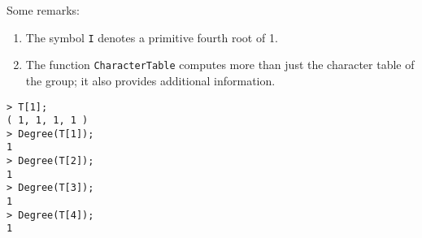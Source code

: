 \begin{example}
%
%
%                   
%                   
%
%
%                
%                
Some remarks: 
 \begin{enumerate}
     \item The symbol \lstinline{I} denotes a primitive fourth root of 1.
     \item 	The function \lstinline{CharacterTable} computes more than just the character table of the group; it also provides additional information.
 \end{enumerate}
%
%
\begin{lstlisting}
> T[1];
( 1, 1, 1, 1 )
> Degree(T[1]);
1
> Degree(T[2]);
1
> Degree(T[3]);
1
> Degree(T[4]);
1    
\end{lstlisting}
\end{example}




